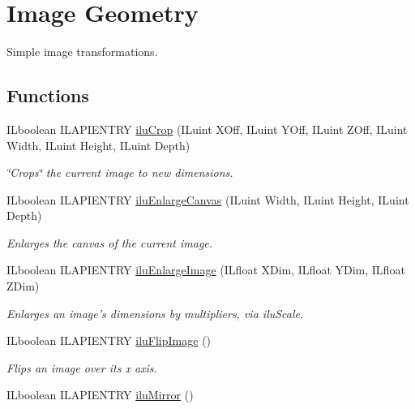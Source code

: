 \hypertarget{group__ilu__geometry}{\section{Image Geometry}
\label{group__ilu__geometry}
}


Simple image transformations.  


\subsection*{Functions}
\begin{DoxyCompactItemize}
\item 
I\-Lboolean I\-L\-A\-P\-I\-E\-N\-T\-R\-Y \hyperlink{group__ilu__geometry_ga80e4330e84ad8ec34c701e9b72c1ffed}{ilu\-Crop} (I\-Luint X\-Off, I\-Luint Y\-Off, I\-Luint Z\-Off, I\-Luint Width, I\-Luint Height, I\-Luint Depth)
\begin{DoxyCompactList}\small\item\em \char`\"{}\-Crops\char`\"{} the current image to new dimensions. \end{DoxyCompactList}\item 
I\-Lboolean I\-L\-A\-P\-I\-E\-N\-T\-R\-Y \hyperlink{group__ilu__geometry_gacba148d63e2e0da80b100c3ada950cb4}{ilu\-Enlarge\-Canvas} (I\-Luint Width, I\-Luint Height, I\-Luint Depth)
\begin{DoxyCompactList}\small\item\em Enlarges the canvas of the current image. \end{DoxyCompactList}\item 
I\-Lboolean I\-L\-A\-P\-I\-E\-N\-T\-R\-Y \hyperlink{group__ilu__geometry_gaa9fe272b82b15ed2e52762e5e763b908}{ilu\-Enlarge\-Image} (I\-Lfloat X\-Dim, I\-Lfloat Y\-Dim, I\-Lfloat Z\-Dim)
\begin{DoxyCompactList}\small\item\em Enlarges an image's dimensions by multipliers, via ilu\-Scale. \end{DoxyCompactList}\item 
\hypertarget{group__ilu__geometry_ga102b4491bacd9ac35795351150f6afa1}{I\-Lboolean I\-L\-A\-P\-I\-E\-N\-T\-R\-Y \hyperlink{group__ilu__geometry_ga102b4491bacd9ac35795351150f6afa1}{ilu\-Flip\-Image} ()}\label{group__ilu__geometry_ga102b4491bacd9ac35795351150f6afa1}

\begin{DoxyCompactList}\small\item\em Flips an image over its x axis. \end{DoxyCompactList}\item 
\hypertarget{group__ilu__geometry_ga34ba55cb258ff33ab1e987a893a83c3c}{I\-Lboolean I\-L\-A\-P\-I\-E\-N\-T\-R\-Y \hyperlink{group__ilu__geometry_ga34ba55cb258ff33ab1e987a893a83c3c}{ilu\-Mirror} ()}\label{group__ilu__geometry_ga34ba55cb258ff33ab1e987a893a83c3c}


\end{DoxyCompactItemize}
